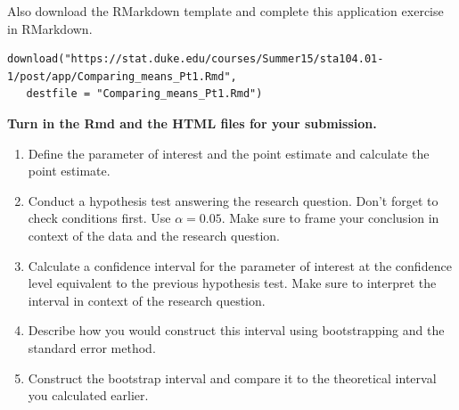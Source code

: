 \documentclass[11pt]{article}
\begin{document}
Also download the RMarkdown template and complete this application exercise in RMarkdown. 
\begin{verbatim}
download("https://stat.duke.edu/courses/Summer15/sta104.01-1/post/app/Comparing_means_Pt1.Rmd",
   destfile = "Comparing_means_Pt1.Rmd")
\end{verbatim}

\textbf{Turn in the Rmd and the HTML files for your submission.} \\

\begin{enumerate}

\item Define the parameter of interest and the point estimate and calculate the point estimate.

\item Conduct a hypothesis test answering the research question. Don't forget to check conditions first. Use $\alpha = 0.05$. Make sure to frame your conclusion in context of the data and the research question.

\item Calculate a confidence interval for the parameter of interest at the confidence level equivalent to the previous hypothesis test. Make sure to interpret the interval in context of the research question.

\item Describe how you would construct this interval using bootstrapping and the standard error method.

\item Construct the bootstrap interval and compare it to the theoretical interval you calculated earlier.

\end{enumerate}



\end{document}
